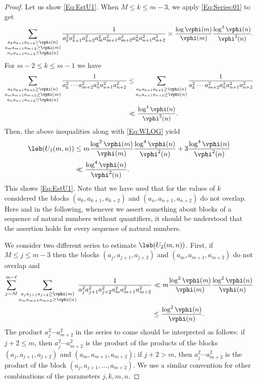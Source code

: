 \documentclass[12pt,a4paper]{amsart}
\begin{document}
\begin{proof}
Let us show \eqref{Eq:EstU1}. When $M\leq k \leq m-3$, we apply \eqref{Eq:Series:01} to get
\[
\sum_{\substack{a_ka_{k+1}a_{k+2} \geq \vphi(n) \\ a_ma_{m+1}a_{m+2} \geq \vphi(m) \\ a_na_{n+1}a_{n+2} \geq \vphi(n)} }
\frac{1}{a_k^2a_{k+1}^2 a_{k+2}^2 a_m^2a_{m+1}^2a_{m+2}^2 a_{n}^2a_{n+1}^2a_{n+2}^2 }
\asymp
\frac{\log\vphi(m)}{\vphi(m)}
\frac{\log^{4}\vphi(n)}{\vphi^2(n)}.
\]
For $m-2\leq k\leq m-1$ we have
\begin{align*}
\sum_{\substack{ a_ka_{k+1}a_{k+2} \geq \vphi(n)\\ a_ma_{m+1}a_{m+2} \geq \vphi(m)\\ a_{n} a_{n+1} a_{n+2}  \geq \vphi(n)}}
\frac{1}{a_{k}^2 \cdots a_{m + 2}^2 a_{n}^2a_{n+1}^2a_{n+2}^2} 
&\leq
\sum_{\substack{ a_ka_{k+1}a_{k+2}\geq \vphi(n)\\ a_{n} a_{n+1} a_{n+2}\geq \vphi(n)}}
\frac{1}{a_{k}^2 \cdots a_{m + 2}^2 a_{n}^2a_{n+1}^2a_{n+2}^2} \\
&\ll
\frac{\log^{4}\vphi(n)}{\vphi^2(n)}.
\end{align*}
Then, the above inequalities along with \eqref{Eq:WLOG} yield
\begin{align*}
\leb(U_1(m,n))
&\leq 
m\frac{\log^{2}\vphi(m)}{\vphi(m)}
\frac{\log^{4}\vphi(n)}{\vphi^2(n)}
+
3 \frac{\log^{4}\vphi(n)}{\vphi^2(n)} \\
&\ll
\frac{\log^{4}\vphi(n)}{\vphi^2(n)}.
\end{align*}
This shows \eqref{Eq:EstU1}. Note that we have used that for the values of $k$ considered the blocks $(a_k,a_{k+1}, a_{k+2})$ and $(a_n,a_{n+1}, a_{n+2})$ do not overlap. Here and in the following, whenever we assert something about blocks of a sequence of natural numbers without quantifiers, it should be understood that the assertion holds for every sequence of natural numbers.

We consider two different series to estimate $\leb(U_2(m,n))$. First, if $M\leq j\leq m- 3$ then the blocks $(a_j,a_{j+1}, a_{j+2})$ and $(a_m,a_{m+1},a_{m+2})$ do not overlap and
\begin{align*}
\sum_{j=M}^{m-\ell} 
\sum_{\substack{ a_j a_{j+1} a_{j+2}\geq \vphi(m) \\ a_ma_{m+1} a_{m+2}\geq \vphi(n)}}
\frac{1}{a_j^2 a_{j+1}^2 a_{j+2}^2 a_m^2a_{m+1}^2 a_{m+2}^2}
&\ll
m \frac{\log^{2}\vphi(m)}{\vphi(m)}\frac{\log^{2}\vphi(n)}{\vphi(n)} \\
&\leq
\frac{\log^{2}\vphi(n)}{\vphi(n)}.
\end{align*}
The product $a_j^2 \cdots a_{m+2}^2$ in the series to come should be interpreted as follows: if $j+2\leq m$, then $a_j^2 \cdots a_{m+2}^2$ is the product of the products of the blocks $(a_j,a_{j+1}, a_{j+2})$ and $(a_m, a_{m+1}, a_{m+2})$; if $j+2> m$, then $a_j^2 \cdots a_{m+2}^2$ is the product of the block $(a_{j},a_{j+1}, \ldots, a_{m+2})$. We use a similar convention for other combinations of the parameters $j,k,m,n$.


\end{proof}
\end{document}
